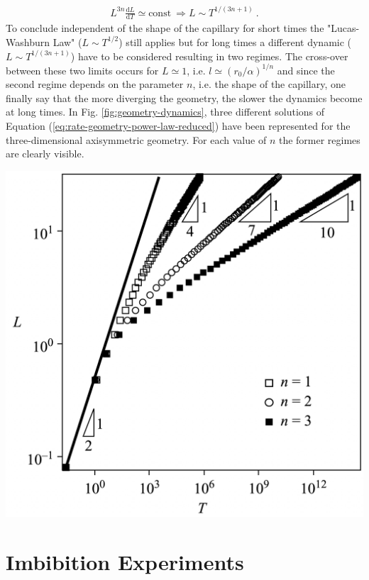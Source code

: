 \documentclass[aip, amsmath, amssymb, reprint, twocolumn, floatfix]{revtex4-1}
\newcommand{\dLdT}{\frac{\mathrm{d}L}{\mathrm{d}T}}
\begin{document}
\begin{gather}
	L^{3n} \dLdT \simeq \text{const}~\Rightarrow \boxed{L \sim T^{1/(3n+1)}}~.
\end{gather}
To conclude independent of the shape of the capillary for short times the "Lucas-Washburn Law" ($L \sim T^{1/2}$) still applies but for long times a different dynamic ($L \sim T^{1/(3n+1)}$) have to be considered resulting in two regimes. The cross-over between these two limits occurs for $L \simeq 1$, i.e. $l \simeq (r_0/\alpha)^{1/n}$ and since the second regime depends on the parameter $n$, i.e. the shape of the capillary, one finally say that the more diverging the geometry, the slower the dynamics become at long times.  In Fig. \ref{fig:geometry-dynamics}, three different solutions of Equation (\ref{eq:rate-geometry-power-law-reduced}) have been represented for the three-dimensional axisymmetric geometry. For each value of $n$ the former regimes are clearly visible.
\begin{center}
	\captionsetup{type=figure}
	\includegraphics[width = \linewidth]{../pictures/Geometry-Dynamics.png}
	\label{fig:geometry-dynamics}
\end{center}

\section{Imbibition Experiments}



\end{document}
